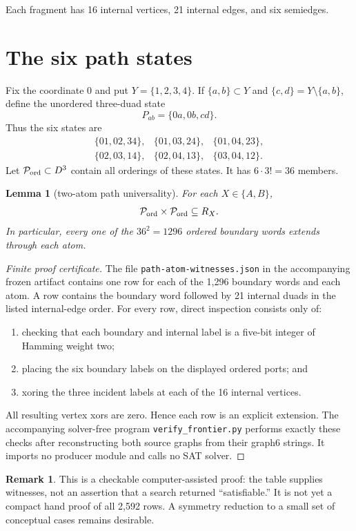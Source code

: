 \documentclass[11pt]{article}
\newtheorem{lemma}[theorem]{Lemma}
\theoremstyle{definition}
\newtheorem{remark}[theorem]{Remark}
\begin{document}
Each fragment has 16 internal vertices, 21 internal edges, and six
semiedges.

\section{The six path states}

Fix the coordinate $0$ and put $Y=\{1,2,3,4\}$.  If
$\{a,b\}\subset Y$ and $\{c,d\}=Y\setminus\{a,b\}$, define the unordered
three-duad state
\[
 P_{ab}=\{0a,0b,cd\}.
\]
Thus the six states are
\[
\begin{array}{lll}
\{01,02,34\},&\{01,03,24\},&\{01,04,23\},\\
\{02,03,14\},&\{02,04,13\},&\{03,04,12\}.
\end{array}
\]
Let $\mathcal P_{\rm ord}\subset D^3$ contain all orderings of these
states.  It has $6\cdot3!=36$ members.

\begin{lemma}[two-atom path universality]\label{lem:local}
For each $X\in\{A,B\}$,
\[
 \mathcal P_{\rm ord}\times\mathcal P_{\rm ord}\subseteq R_X.
\]
In particular, every one of the $36^2=1296$ ordered boundary words extends
through each atom.
\end{lemma}

\begin{proof}[Finite proof certificate]
The file \texttt{path-atom-witnesses.json} in the accompanying frozen
artifact contains one row for each of the 1,296 boundary words and each atom.
A row contains the boundary word followed by 21 internal duads in the listed
internal-edge order.  For every row, direct inspection consists only of:
\begin{enumerate}
  \item checking that each boundary and internal label is a five-bit integer
        of Hamming weight two;
  \item placing the six boundary labels on the displayed ordered ports; and
  \item xoring the three incident labels at each of the 16 internal vertices.
\end{enumerate}
All resulting vertex xors are zero.  Hence each row is an explicit extension.
The accompanying solver-free program \texttt{verify\_frontier.py} performs
exactly these checks after reconstructing both source graphs from their
graph6 strings.  It imports no producer module and calls no SAT solver.
\end{proof}

\begin{remark}
This is a checkable computer-assisted proof: the table supplies witnesses,
not an assertion that a search returned ``satisfiable.''  It is not yet a
compact hand proof of all 2,592 rows.  A symmetry reduction to a small set of
conceptual cases remains desirable.
\end{remark}
\end{document}
